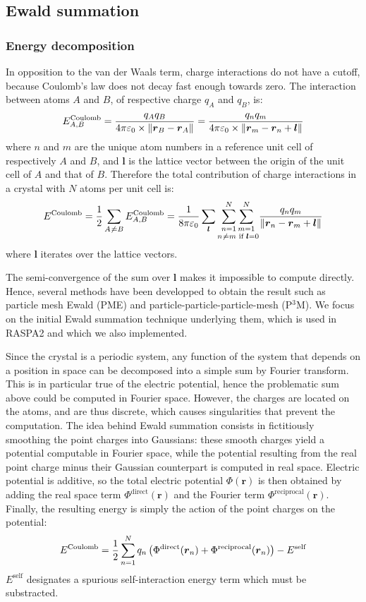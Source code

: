\documentclass[main.tex]{subfiles}
\begin{document}
\subsection{Ewald summation}

\subsubsection{Energy decomposition}

In opposition to the van der Waals term, charge interactions do not have a cutoff, because Coulomb's law does not decay fast enough towards zero. The interaction between atoms $A$ and $B$, of respective charge $q_A$ and $q_B$, is:
\[E^\text{Coulomb}_{A,B} = \frac{q_A q_B}{4\pi\varepsilon_0\times \left\|\boldsymbol r_B - \boldsymbol r_A\right\|} = \frac{q_n q_m}{4\pi\varepsilon_0\times \left\|\boldsymbol r_m - \boldsymbol r_n + \boldsymbol l\right\|}\]
where $n$ and $m$ are the unique atom numbers in a reference unit cell of respectively $A$ and $B$, and $\boldsymbol l$ is the lattice vector between the origin of the unit cell of $A$ and that of $B$.
Therefore the total contribution of charge interactions in a crystal with $N$ atoms per unit cell is:
\[E^\text{Coulomb} = \frac12\sum_{A\not\kern0.2ex= B}E^\text{Coulomb}_{A,B}
                   = \frac1{8\pi\varepsilon_0}\sum_{\boldsymbol l}\underset{n\not\kern0.2ex= m\text{ if }\boldsymbol l = 0}{\sum_{n=1}^N\sum_{m=1}^N} \frac{q_n q_m}{\left\|\boldsymbol r_n - \boldsymbol r_m + \boldsymbol l\right\|}\]
where $\boldsymbol l$ iterates over the lattice vectors.

The semi-convergence of the sum over $\boldsymbol l$ makes it impossible to compute directly. Hence, several methods have been developped to obtain the result such as particle mesh Ewald (PME) and particle-particle-particle-mesh (P$^3$M). We focus on the initial Ewald summation technique underlying them, which is used in RASPA2 and which we also implemented.

Since the crystal is a periodic system, any function of the system that depends on a position in space can be decomposed into a simple sum by Fourier transform. This is in particular true of the electric potential, hence the problematic sum above could be computed in Fourier space. However, the charges are located on the atoms, and are thus discrete, which causes singularities that prevent the computation. The idea behind Ewald summation consists in fictitiously smoothing the point charges into Gaussians: these smooth charges yield a potential computable in Fourier space, while the potential resulting from the real point charge minus their Gaussian counterpart is computed in real space. Electric potential is additive, so the total electric potential $\Phi(\boldsymbol r)$ is then obtained by adding the real space term $\Phi^\text{direct}(\boldsymbol r)$ and the Fourier term $\Phi^\text{reciprocal}(\boldsymbol r)$. Finally, the resulting energy is simply the action of the point charges on the potential:
\[E^\text{Coulomb} = \frac12\sum_{n=1}^N q_n\left(\Phi^\text{direct}(\boldsymbol r_n) + \Phi^\text{reciprocal}(\boldsymbol r_n)\right) - E^{\text{self}}\]
$E^{\text{self}}$ designates a spurious self-interaction energy term which must be substracted.
\end{document}
